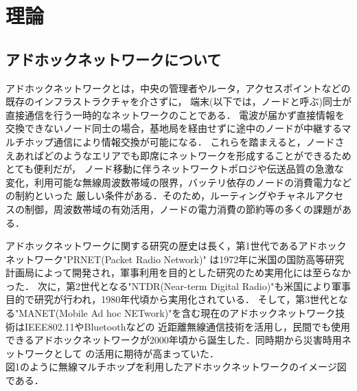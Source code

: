 \documentclass[a4paper, 11pt]{ltjsarticle}
\begin{document}
\clearpage
\section{理論}
\subsection{アドホックネットワークについて}
アドホックネットワークとは，中央の管理者やルータ，アクセスポイントなどの既存のインフラストラクチャを介さずに，
端末(以下では，ノードと呼ぶ)同士が直接通信を行う一時的なネットワークのことである．
電波が届かず直接情報を交換できないノード同士の場合，基地局を経由せずに途中のノードが中継するマルチホップ通信により情報交換が可能になる．
これらを踏まえると，ノードさえあればどのようなエリアでも即席にネットワークを形成することができるためとても便利だが，
ノード移動に伴うネットワークトポロジや伝送品質の急激な変化，利用可能な無線周波数帯域の限界，バッテリ依存のノードの消費電力などの制約といった
厳しい条件がある．そのため，ルーティングやチャネルアクセスの制御，周波数帯域の有効活用，ノードの電力消費の節約等の多くの課題がある\cite{間瀬憲一2001アドホックネットワーク}．

アドホックネットワークに関する研究の歴史は長く，第1世代であるアドホックネットワーク"PRNET(Packet Radio Network)"
は1972年に米国の国防高等研究計画局によって開発され，軍事利用を目的とした研究のため実用化には至らなかった．
次に，第2世代となる"NTDR(Near-term Digital Radio)"も米国により軍事目的で研究が行われ，1980年代頃から実用化されている．
そして，第3世代となる"MANET(Mobile Ad hoc NETwork)"を含む現在のアドホックネットワーク技術はIEEE802.11やBluetoothなどの
近距離無線通信技術を活用し，民間でも使用できるアドホックネットワークが2000年頃から誕生した．同時期から災害時用ネットワークとして
の活用に期待が高まっていた．\\

図1のように無線マルチホップを利用したアドホックネットワークのイメージ図である．

\end{document}
